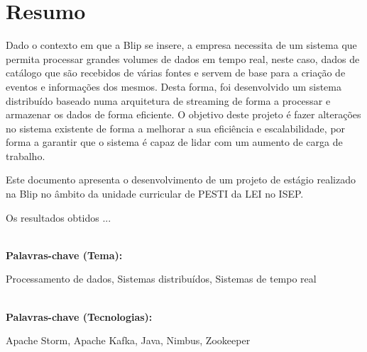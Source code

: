 \titleformat{\chapter}[display]
{\normalfont\bfseries}{}{0pt}{\Huge}

\chapter*{Resumo}

Dado o contexto em que a Blip se insere, a empresa necessita de um sistema que permita processar
grandes volumes de dados em tempo real, neste caso, dados de catálogo que são recebidos de várias fontes
e servem de base para a criação de eventos e informações dos mesmos. Desta forma, foi desenvolvido 
um sistema distribuído baseado numa arquitetura de streaming de forma a processar e armazenar os 
dados de forma eficiente. O objetivo deste projeto é fazer alterações no sistema existente de forma 
a melhorar a sua eficiência e escalabilidade, por forma a garantir que o sistema é capaz de lidar 
com um aumento de carga de  trabalho.

Este documento apresenta o desenvolvimento de um projeto de estágio realizado na Blip no âmbito da 
unidade curricular de \ac{PESTI} da \ac{LEI} no \ac{ISEP}. 

Os resultados obtidos ...



\textbf{\\Palavras-chave (Tema): } 

Processamento de dados, Sistemas distribuídos, Sistemas de tempo real

\textbf{\\Palavras-chave (Tecnologias):}

Apache Storm, Apache Kafka, Java, Nimbus, Zookeeper


